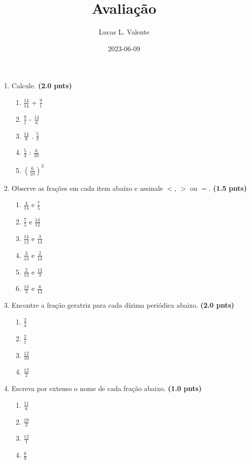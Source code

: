 \documentclass{article}
\title{Avaliação}
\author{Lucas L. Valente}
\date{2023-06-09}
\begin{document}
\maketitle
\newpage

\begin{enumerate}
	\item Calcule. \textbf{(2.0 pnts)}

		\begin{enumerate}
			\item $\frac{14}{14}$ + $\frac{9}{1}$
			\item $\frac{9}{1}$ - $\frac{14}{6}$
			\item $\frac{14}{6}$ . $\frac{5}{3}$
			\item $\frac{5}{3}$ : $\frac{6}{10}$
			\item $\left(\frac{6}{10}\right) ^ 3$
		\end{enumerate}

	\item Observe as frações em cada item abaixo e assinale $<$, $>$ ou $=$. \textbf{(1.5 pnts)}

		\begin{enumerate}
			\item $\frac{4}{14}$ e $\frac{7}{5}$
			\item $\frac{7}{5}$ e $\frac{14}{12}$
			\item $\frac{14}{12}$ e $\frac{3}{13}$
			\item $\frac{3}{13}$ e $\frac{2}{13}$
			\item $\frac{2}{13}$ e $\frac{13}{3}$
			\item $\frac{13}{3}$ e $\frac{6}{13}$
		\end{enumerate}

	\item Encontre a fração geratriz para cada dízima periódica abaixo. \textbf{(2.0 pnts)}

		\begin{enumerate}
			\item $\frac{2}{4}$
			\item $\frac{2}{1}$
			\item $\frac{12}{10}$
			\item $\frac{12}{2}$
		\end{enumerate}

	\item Escreva por extenso o nome de cada fração abaixo. \textbf{(1.0 pnts)}

		\begin{enumerate}
			\item $\frac{11}{6}$
			\item $\frac{10}{3}$
			\item $\frac{12}{1}$
			\item $\frac{8}{9}$
		\end{enumerate}


\end{enumerate}
\end{document}
